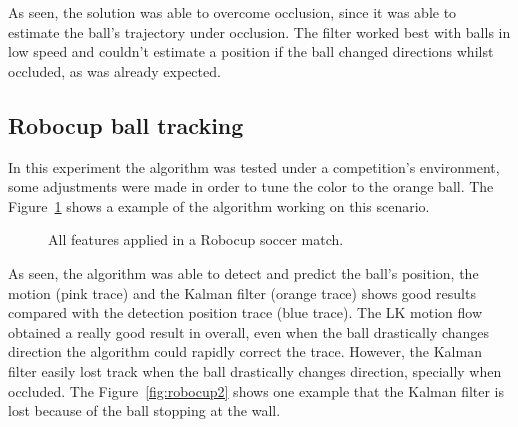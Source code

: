 \documentclass[10pt,twocolumn,letterpaper]{article}
\begin{document}
As seen, the solution was able to overcome occlusion, since it was able to estimate the ball's trajectory under occlusion. The filter worked best with balls in low speed and couldn't estimate a position if the ball changed directions whilst occluded, as was already expected.

\subsection{Robocup ball tracking}

In this experiment the algorithm was tested under a competition's environment, some adjustments were made in order to tune the color to the orange ball. The Figure~\ref{fig:robocup_1} shows a example of the algorithm working on this scenario.

\begin{figure}[!h]
\centering
\setlength{\fboxsep}{1pt}
\setlength{\fboxrule}{1pt}
\caption{All features applied in a Robocup soccer match.}\label{fig:robocup_1}
\end{figure}

As seen, the algorithm was able to detect and predict the ball's position, the motion (pink trace) and the Kalman filter (orange trace) shows good results compared with the detection position trace (blue trace). The LK motion flow obtained a really good result in overall, even when the ball drastically changes direction  the algorithm could rapidly correct the trace.  However,  the Kalman filter easily lost track when the ball drastically changes direction, specially when occluded. The Figure~\ref{fig:robocup2} shows one example that the Kalman filter is lost because of the ball stopping at the wall.
\end{document}
